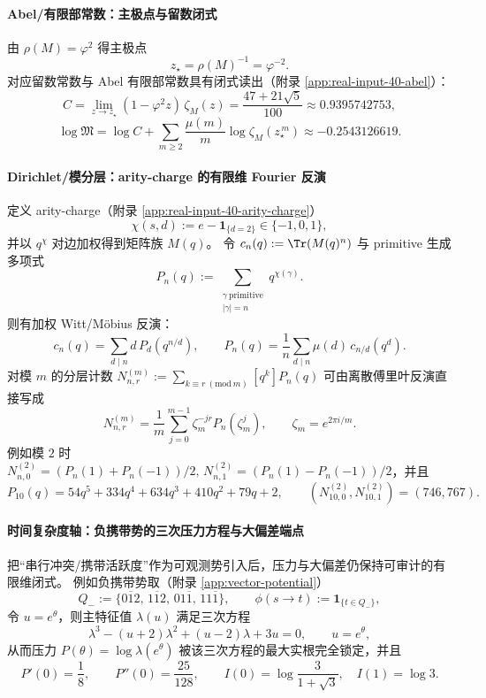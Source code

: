 \paragraph{Abel/有限部常数：主极点与留数闭式}
由 $\rho(M)=\varphi^2$ 得主极点
\[
z_\star=\rho(M)^{-1}=\varphi^{-2}.
\]
对应留数常数与 Abel 有限部常数具有闭式读出（附录 \ref{app:real-input-40-abel}）：
\[
\boxed{\;
C=\lim_{z\to z_\star}(1-\varphi^2 z)\,\zeta_M(z)=\frac{47+21\sqrt5}{100}\approx 0.9395742753,\;}
\]
\[
\boxed{\;
\log\mathfrak{M}=\log C+\sum_{m\ge 2}\frac{\mu(m)}{m}\log\zeta_M(z_\star^{\,m})
\approx -0.2543126619.\;}
\]

\paragraph{Dirichlet/模分层：arity-charge 的有限维 Fourier 反演}
定义 arity-charge（附录 \ref{app:real-input-40-arity-charge}）
\[
\chi(s,d):=e-\mathbf{1}_{\{d=2\}}\in\{-1,0,1\},
\]
并以 $q^{\chi}$ 对边加权得到矩阵族 $M(q)$。
令
\(
c_n(q):=\Tr(M(q)^n)
\)
与 primitive 生成多项式
\[
P_n(q):=\sum_{\substack{\gamma\ \mathrm{primitive}\\|\gamma|=n}}q^{\chi(\gamma)}.
\]
则有加权 Witt/Möbius 反演：
\[
c_n(q)=\sum_{d\mid n}d\,P_d\!\left(q^{n/d}\right),
\qquad
P_n(q)=\frac{1}{n}\sum_{d\mid n}\mu(d)\,c_{n/d}\!\left(q^{d}\right).
\]
对模 $m$ 的分层计数
\(
N_{n,r}^{(m)}:=\sum_{k\equiv r\ (\mathrm{mod}\ m)}[q^k]P_n(q)
\)
可由离散傅里叶反演直接写成
\[
\boxed{\;
N_{n,r}^{(m)}=\frac{1}{m}\sum_{j=0}^{m-1}\zeta_m^{-jr}P_n(\zeta_m^j),
\qquad \zeta_m=e^{2\pi i/m}.\;}
\]
例如模 $2$ 时
\(
N_{n,0}^{(2)}=(P_n(1)+P_n(-1))/2,\,
N_{n,1}^{(2)}=(P_n(1)-P_n(-1))/2
\)，并且
\[
P_{10}(q)=54q^5+334q^4+634q^3+410q^2+79q+2,
\qquad
(N_{10,0}^{(2)},N_{10,1}^{(2)})=(746,767).
\]

\paragraph{时间复杂度轴：负携带势的三次压力方程与大偏差端点}
把“串行冲突/携带活跃度”作为可观测势引入后，压力与大偏差仍保持可审计的有限维闭式。
例如负携带势取（附录 \ref{app:vector-potential}）
\[
Q_-:=\{0\overline{1}2,\,1\overline{1}2,\,01\overline{1},\,11\overline{1}\},
\qquad
\phi(s\to t):=\mathbf{1}_{\{t\in Q_-\}},
\]
令 $u=e^\theta$，则主特征值 $\lambda(u)$ 满足三次方程
\[
\boxed{\;
\lambda^3-(u+2)\lambda^2+(u-2)\lambda+3u=0,\qquad u=e^\theta,\;}
\]
从而压力 $P(\theta)=\log\lambda(e^\theta)$ 被该三次方程的最大实根完全锁定，并且
\[
P'(0)=\frac18,\qquad P''(0)=\frac{25}{128},
\qquad
I(0)=\log\frac{3}{1+\sqrt3},\quad I(1)=\log 3.
\]

